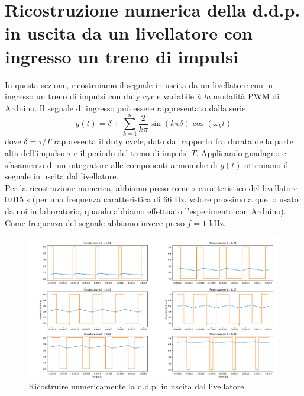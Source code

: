 \documentclass{article}[a4paper, oneside,11pt]
\begin{document}
\section{Ricostruzione numerica della d.d.p. in uscita da un livellatore con ingresso un treno di impulsi}
    In questa sezione, ricostruiamo il segnale in uscita da un livellatore con in ingresso un treno di impulsi con duty cycle variabile \textit{à la} modalità PWM di Arduino. Il segnale di ingresso può essere rappresentato dalla serie:
    \[g(t)=\delta+\sum_{k=1}^{n} \frac{2}{k\pi} \sin(k\pi\delta)\cos(\omega_kt)\]
    dove $\delta = \tau/T$ rappresenta il duty cycle, dato dal rapporto fra durata della parte alta dell'impulso $\tau$ e il periodo del treno di impulsi $T$.
    Applicando guadagno e sfasamento di un integratore alle componenti armoniche di $g(t)$ otteniamo il segnale in uscita dal livellatore.\\
    Per la ricostruzione numerica, abbiamo preso come $\tau$ caratteristico del livellatore 0.015 s (per una frequenza caratteristica di 66 Hz, valore prossimo a quello usato da noi in laboratorio, quando abbiamo effettuato l'esperimento con Arduino). Come frequenza del segnale abbiamo invece preso $f=1$ kHz.
    \begin{figure}[H]
        \centering
        \includegraphics[width=1.0\textwidth]{img/PWM.png}
        \caption{Ricostruire numericamente la d.d.p. in uscita dal livellatore.}
    \end{figure}
\end{document}
